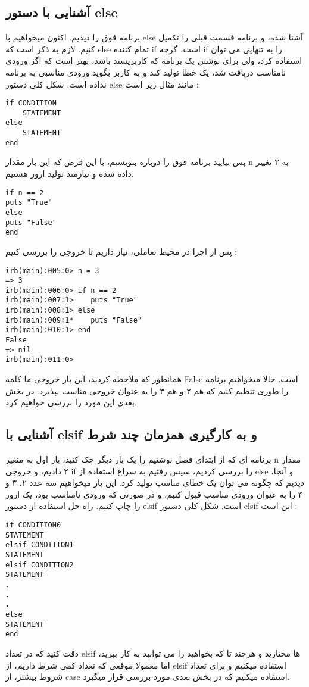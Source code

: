 \documentclass[11pt]{article}
\begin{document}
\subsection{آشنایی با دستور else}
برنامه فوق را دیدیم. اکنون میخواهیم با else آشنا شده، و برنامه قسمت قبلی را تکمیل کنیم. لازم به ذکر است که else تمام کننده if است، گرچه if را به تنهایی می توان استفاده کرد، ولی برای نوشتن یک برنامه که کاربرپسند
باشد، بهتر است که اگر ورودی نامناسب دریافت شد، یک خطا تولید کند و به کاربر بگوید ورودی مناسبی به برنامه نداده است. شکل کلی دستور else مانند مثال زیر است :
\begin{latin}
\begin{verbatim}
if CONDITION
	STATEMENT
else
	STATEMENT
end
\end{verbatim}

\end{latin}
پس بیایید برنامه فوق را دوباره بنویسیم، با این فرض که این بار مقدار n به ۳ تغییر داده شده و نیازمند تولید ارور هستیم. 
\begin{latin}
\begin{verbatim}
if n == 2
puts "True"
else
puts "False"
end
\end{verbatim}
\end{latin}
پس از اجرا در محیط تعاملی، نیاز داریم تا خروجی را بررسی کنیم :
\begin{latin}
\begin{verbatim}
irb(main):005:0> n = 3
=> 3
irb(main):006:0> if n == 2
irb(main):007:1>    puts "True"
irb(main):008:1> else
irb(main):009:1*    puts "False"
irb(main):010:1> end
False
=> nil
irb(main):011:0> 
\end{verbatim}
\end{latin}
همانطور که ملاحظه کردید، این بار خروجی ما کلمه False است. حالا میخواهیم برنامه را طوری تنظیم کنیم که هم ۲ و هم ۳ را به عنوان خروجی مناسب بپذیرد. در بخش بعدی این مورد را بررسی خواهیم کرد. 
\subsection{آشنایی با elsif و به کارگیری همزمان چند شرط}
برنامه ای که از ابتدای فصل نوشتیم را یک بار دیگر چک کنید، بار اول به متغیر n مقدار ۲ دادیم، و خروجی if را بررسی کردیم، سپس رفتیم به سراغ استفاده از else و آنجا، دیدیم که چگونه می توان یک خطای مناسب تولید کرد. این بار میخواهیم سه عدد ۲، ۳ و ۴ را به عنوان ورودی مناسب قبول کنیم، و در صورتی که ورودی نامناسب بود، یک ارور را چاپ کنیم. راه حل استفاده از دستور elsif است. شکل کلی دستور elsif این است :
\begin{latin}
\begin{verbatim}
if CONDITION0
STATEMENT
elsif CONDITION1
STATEMENT
elsif CONDITION2
STATEMENT
.
.
.
else
STATEMENT
end
\end{verbatim}
\end{latin}
دقت کنید که در تعداد elsif ها مختارید و هرچند تا که بخواهید را می توانید به کار ببرید، اما معمولا موقعی که تعداد کمی شرط داریم، از elsif استفاده میکنیم و برای تعداد شروط بیشتر، از case استفاده میکنیم که در بخش بعدی مورد بررسی قرار میگیرد. 
\end{document}
